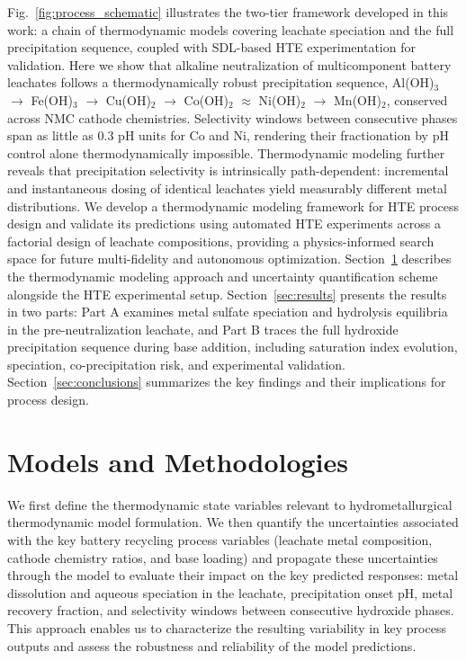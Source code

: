 \documentclass[final,2p,times]{elsarticle}
\begin{document}
Fig.~\ref{fig:process_schematic} illustrates the two-tier framework developed in this work: a chain of thermodynamic models covering leachate speciation and the full precipitation sequence, coupled with SDL-based HTE experimentation for validation. Here we show that alkaline neutralization of multicomponent battery leachates follows a thermodynamically robust precipitation sequence, Al(OH)$_3$ $\to$ Fe(OH)$_3$ $\to$ Cu(OH)$_2$ $\to$ Co(OH)$_2$ $\approx$ Ni(OH)$_2$ $\to$ Mn(OH)$_2$, conserved across NMC cathode chemistries. Selectivity windows between consecutive phases span as little as 0.3 pH units for Co and Ni, rendering their fractionation by pH control alone thermodynamically impossible. Thermodynamic modeling further reveals that precipitation selectivity is intrinsically path-dependent: incremental and instantaneous dosing of identical leachates yield measurably different metal distributions. We develop a thermodynamic modeling framework for HTE process design and validate its predictions using automated HTE experiments across a factorial design of leachate compositions, providing a physics-informed search space for future multi-fidelity and autonomous optimization. Section~\ref{sec:methods} describes the thermodynamic modeling approach and uncertainty quantification scheme alongside the HTE experimental setup. Section~\ref{sec:results} presents the results in two parts: Part A examines metal sulfate speciation and hydrolysis equilibria in the pre-neutralization leachate, and Part B traces the full hydroxide precipitation sequence during base addition, including saturation index evolution, speciation, co-precipitation risk, and experimental validation. Section~\ref{sec:conclusions} summarizes the key findings and their implications for process design.


\section{Models and Methodologies}\label{sec:methods}

We first define the thermodynamic state variables relevant to hydrometallurgical thermodynamic model formulation. We then quantify the uncertainties associated with the key battery recycling process variables (leachate metal composition, cathode chemistry ratios, and base loading) and propagate these uncertainties through the model to evaluate their impact on the key predicted responses: metal dissolution and aqueous speciation in the leachate, precipitation onset pH, metal recovery fraction, and selectivity windows between consecutive hydroxide phases. This approach enables us to characterize the resulting variability in key process outputs and assess the robustness and reliability of the model predictions.
\end{document}
